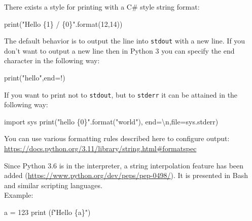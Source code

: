 \documentclass[
]{article}
\newenvironment{Shaded}{}{}
\newcommand{\BuiltInTok}[1]{#1}
\newcommand{\CharTok}[1]{\textcolor[rgb]{0.25,0.44,0.63}{#1}}
\newcommand{\DecValTok}[1]{\textcolor[rgb]{0.25,0.63,0.44}{#1}}
\newcommand{\ImportTok}[1]{#1}
\newcommand{\NormalTok}[1]{#1}
\newcommand{\OperatorTok}[1]{\textcolor[rgb]{0.40,0.40,0.40}{#1}}
\newcommand{\SpecialCharTok}[1]{\textcolor[rgb]{0.25,0.44,0.63}{#1}}
\newcommand{\SpecialStringTok}[1]{\textcolor[rgb]{0.73,0.40,0.53}{#1}}
\newcommand{\StringTok}[1]{\textcolor[rgb]{0.25,0.44,0.63}{#1}}
\begin{document}
There exists a style for printing with a C\# style string format:

\begin{Shaded}
\begin{Highlighting}[]
\BuiltInTok{print}\NormalTok{(}\StringTok{"Hello }\SpecialCharTok{\{1\}}\StringTok{ / }\SpecialCharTok{\{0\}}\StringTok{"}\NormalTok{.}\BuiltInTok{format}\NormalTok{(}\DecValTok{12}\NormalTok{,}\DecValTok{14}\NormalTok{))}
\end{Highlighting}
\end{Shaded}

The default behavior is to output the line into \texttt{stdout} with a
new line. If you don't want to output a new line then in Python 3 you
can specify the end character in the following way:

\begin{Shaded}
\begin{Highlighting}[]
\BuiltInTok{print}\NormalTok{(}\StringTok{"hello"}\NormalTok{,end}\OperatorTok{=}\StringTok{\textquotesingle{}!\textquotesingle{}}\NormalTok{)}
\end{Highlighting}
\end{Shaded}

If you want to print not to \texttt{stdout}, but to \texttt{stderr} it
can be attained in the following way:

\begin{Shaded}
\begin{Highlighting}[]
\ImportTok{import}\NormalTok{ sys}
\BuiltInTok{print}\NormalTok{(}\StringTok{"hello }\SpecialCharTok{\{0\}}\StringTok{"}\NormalTok{.}\BuiltInTok{format}\NormalTok{(}\StringTok{"world"}\NormalTok{), end}\OperatorTok{=}\StringTok{\textquotesingle{}}\CharTok{\textbackslash{}n}\StringTok{\textquotesingle{}}\NormalTok{,}\BuiltInTok{file}\OperatorTok{=}\NormalTok{sys.stderr)}
\end{Highlighting}
\end{Shaded}

You can use various formatting rules described here to configure
output:\\
\url{https://docs.python.org/3.11/library/string.html\#formatspec}

Since Python 3.6 is in the interpreter, a string interpolation feature
has been added (\url{https://www.python.org/dev/peps/pep-0498/}). It is
presented in Bash and similar scripting languages.\\
Example:

\begin{Shaded}
\begin{Highlighting}[]
\NormalTok{a }\OperatorTok{=} \DecValTok{123}
\BuiltInTok{print}\NormalTok{ (}\SpecialStringTok{f"Hello }\SpecialCharTok{\{}\NormalTok{a}\SpecialCharTok{\}}\SpecialStringTok{"}\NormalTok{)}
\end{Highlighting}
\end{Shaded}
\end{document}
